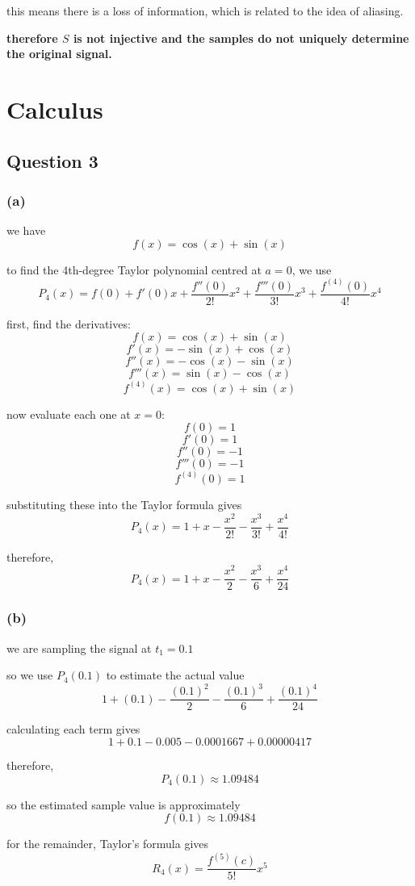 \documentclass{article}
\begin{document}
this means there is a loss of information, which is related to the idea of aliasing.

\textbf{therefore $S$ is not injective and the samples do not uniquely determine the original signal.}

\section{Calculus}

\subsection{Question 3}

\subsubsection*{(a)}
we have
\[
f(x)=\cos(x)+\sin(x)
\]

to find the 4th-degree Taylor polynomial centred at $a=0$, we use
\[
P_4(x)=f(0)+f'(0)x+\frac{f''(0)}{2!}x^2 + \frac{f'''(0)}{3!}x^3+\frac{f^{(4)}(0)}{4!}x^4
\]

first, find the derivatives:
$$f(x)=\cos(x)+\sin(x)$$
$$f'(x)=-\sin(x)+\cos(x)$$
$$f''(x)=-\cos(x)-\sin(x)$$
$$f'''(x)=\sin(x)-\cos(x)$$
$$f^{(4)}(x)=\cos(x)+\sin(x)$$

now evaluate each one at $x=0$:
$$f(0)=1$$
$$f'(0)=1$$
$$f''(0)=-1$$
$$f'''(0)=-1$$
$$f^{(4)}(0)=1$$

substituting these into the Taylor formula gives
\[
P_4(x) = 1+x-\frac{x^2}{2!}-\frac{x^3}{3!}+\frac{x^4}{4!}
\]

therefore,
\[
\boxed{P_4(x) = 1+x-\frac{x^2}{2}-\frac{x^3}{6}+\frac{x^4}{24}}
\]

\subsubsection*{(b)}
we are sampling the signal at $t_1=0.1$

so we use $P_4(0.1)$ to estimate the actual value
\[
1+(0.1)-\frac{(0.1)^2}{2} - \frac{(0.1)^3}{6} + \frac{(0.1)^4}{24}
\]

calculating each term gives
\[
1+0.1-0.005-0.0001667+0.00000417
\]

therefore,
\[
\boxed{P_4(0.1)\approx1.09484}
\]

so the estimated sample value is approximately
\[
\boxed{f(0.1)\approx1.09484}
\]

for the remainder, Taylor's formula gives
\[
R_4(x)=\frac{f^{(5)}(c)}{5!}x^5
\]
\end{document}
